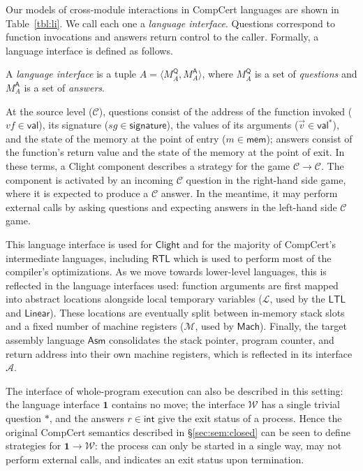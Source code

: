 \documentclass[sigplan,10pt,review,anonymous]{acmart}
\newcommand{\kw}[1]{\ensuremath{ \mathsf{#1} }}
\begin{document}
Our models of cross-module interactions in CompCert languages
are shown in Table~\ref{tbl:li}.
We call each one a \emph{language interface}.
Questions correspond to function invocations
and answers return control to the caller.
Formally,
a language interface is defined as follows.

\begin{definition}
A \emph{language interface} is a tuple
$A = \langle M_A^\kw{Q}, M_A^\kw{A} \rangle$, where
$M_A^\kw{Q}$ is a set of \emph{questions} and
$M_A^\kw{A}$ is a set of \emph{answers}.
\end{definition}

At the source level ($\mathcal{C}$),
questions consist of
the address of the function invoked
($\mathit{vf} \in \kw{val}$),
its signature
($\mathit{sg} \in \kw{signature}$),
the values of its arguments
($\vec{v} \in \kw{val}^*$),
and the state of the memory at the point of entry
($m \in \kw{mem}$);
answers
consist of the function's return value
and the state of the memory at the point of exit.
In these terms,
a Clight component describes a strategy for the game
$\mathcal{C} \rightarrow \mathcal{C}$.
The component is activated by an incoming $\mathcal{C}$ question
in the right-hand side game,
where it is expected to produce a $\mathcal{C}$ answer.
In the meantime,
it may perform external calls by
asking questions and expecting answers
in the left-hand side $\mathcal{C}$ game.

This language interface is used for \kw{Clight} and
for the majority of CompCert's intermediate languages,
including \kw{RTL} which is used to perform
most of the compiler's optimizations.
As we move towards lower-level languages,
this is reflected in the language interfaces used:
function arguments are first mapped into
abstract locations alongside local temporary variables
($\mathcal{L}$, used by the \kw{LTL} and \kw{Linear}).
These locations are eventually split between
in-memory stack slots and a fixed number of machine registers
($\mathcal{M}$, used by \kw{Mach}).
Finally, the target assembly language \kw{Asm}
consolidates the stack pointer, program counter,
and return address into their own machine registers,
which is reflected in its interface $\mathcal{A}$.

The interface of whole-program execution
can also be described in this setting:
the language interface $\mathbf{1}$ contains no move;
the interface $\mathcal{W}$ has a single trivial question $*$,
and the answers $r \in \kw{int}$
give the exit status of a process.
Hence the original CompCert semantics described in
\S\ref{sec:sem:closed}
can be seen to define strategies for
$\mathbf{1} \rightarrow \mathcal{W}$:
the process can only be started in a single way,
may not perform external calls,
and indicates an exit status upon termination.
\end{document}
